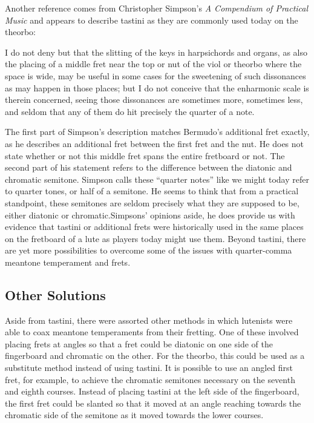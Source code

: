 Another reference comes from Christopher Simpson's \textit{A Compendium of Practical
Music} and appears to describe tastini as they are commonly used today on the theorbo:
\begin{blocks}
I do not deny but that the slitting of the keys in harpsichords and organs, as also the
placing of a middle fret near the top or nut of the viol or theorbo where the space is
wide, may be useful in some cases for the sweetening of such dissonances as may happen
in those places; but I do not conceive that the enharmonic scale is therein concerned,
seeing those dissonances are sometimes more, sometimes less, and seldom that any of them
do hit precisely the quarter of a note. \autocite[51]{CS:1}
\end{blocks}
The first part of Simpson's description matches Bermudo's additional fret exactly, as
he describes an additional fret between the first fret and the nut.  He does not state
whether or not this middle fret spans the entire fretboard or not.  The second part of
his statement refers to the difference between the diatonic and chromatic semitone.
Simpson calls these ``quarter notes'' like we might today refer to quarter tones, or
half of a semitone.  He seems to think that from a practical standpoint, these
semitones are seldom precisely what they are supposed to be, either diatonic or
chromatic.Simpsons' opinions aside, he does provide us with evidence that tastini or
additional frets were historically used in the same places on the fretboard of a lute
as players today might use them.  Beyond tastini, there are yet more possibilities to
overcome some of the issues with quarter-comma meantone temperament and frets.

\subsection{Other Solutions}

Aside from tastini, there were assorted other methods in which lutenists were able to
coax meantone temperaments from their fretting.  One of these involved placing frets
at angles so that a fret could be diatonic on one side of the
fingerboard and chromatic on the other.  For the theorbo, this could be used as a
substitute method instead of using tastini.  It is possible to use an angled first fret,
for example, to achieve the chromatic semitones necessary on the seventh and eighth
courses.  Instead of placing tastini at the left side of the fingerboard, the first fret
could be slanted so that it moved at an angle reaching towards the chromatic side of the
semitone as it moved towards the lower courses.

